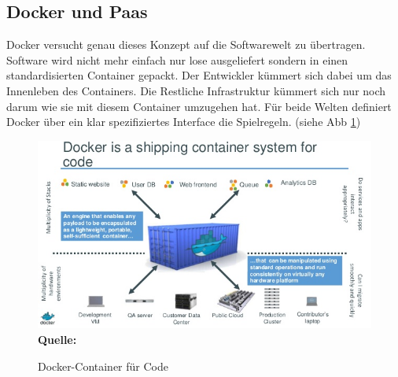 \subsection{Docker und Paas}
\label{sec:docker_und_paas}
Docker versucht genau dieses Konzept auf die Softwarewelt zu übertragen. 
Software wird nicht mehr einfach nur lose ausgeliefert sondern in einen standardisierten Container gepackt. Der Entwickler kümmert sich dabei um das Innenleben des Containers. Die Restliche Infrastruktur kümmert sich nur noch darum wie sie mit diesem Container umzugehen hat. Für beide Welten definiert Docker über ein klar spezifiziertes Interface die Spielregeln. (siehe Abb \ref{fig:container_fuer_code})
\begin{figure}[htbp]
  \centering  
  \includegraphics[scale=0.7]{img/hardware_software_container.jpg}\\
  \footnotesize\sffamily\textbf{Quelle:} \cite{hykes_docker_2013}
  \caption{Docker-Container für Code}
  \label{fig:container_fuer_code}
\end{figure}

